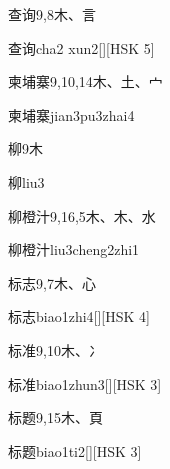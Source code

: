 \begin{entry}{查询}{9,8}{⽊、⾔}
  \begin{phonetics}{查询}{cha2 xun2}[][HSK 5]
  \end{phonetics}
\end{entry}

\begin{entry}{柬埔寨}{9,10,14}{⽊、⼟、⼧}
  \begin{phonetics}{柬埔寨}{jian3pu3zhai4}
  \end{phonetics}
\end{entry}

\begin{entry}{柳}{9}{⽊}
  \begin{phonetics}{柳}{liu3}
  \end{phonetics}
\end{entry}

\begin{entry}{柳橙汁}{9,16,5}{⽊、⽊、⽔}
  \begin{phonetics}{柳橙汁}{liu3cheng2zhi1}
  \end{phonetics}
\end{entry}

\begin{entry}{标志}{9,7}{⽊、⼼}
  \begin{phonetics}{标志}{biao1zhi4}[][HSK 4]
  \end{phonetics}
\end{entry}

\begin{entry}{标准}{9,10}{⽊、⼎}
  \begin{phonetics}{标准}{biao1zhun3}[][HSK 3]
  \end{phonetics}
\end{entry}

\begin{entry}{标题}{9,15}{⽊、⾴}
  \begin{phonetics}{标题}{biao1ti2}[][HSK 3]
  \end{phonetics}
\end{entry}

